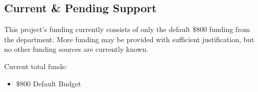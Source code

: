 \subsection{Current \& Pending Support}
This project's funding currently consists of only the default \$800 funding from the department. More funding may be provided with sufficient justification, but no other funding sources are currently known.

    Current total funds:
    \begin{itemize}
        \item \$800 Default Budget
    \end{itemize}